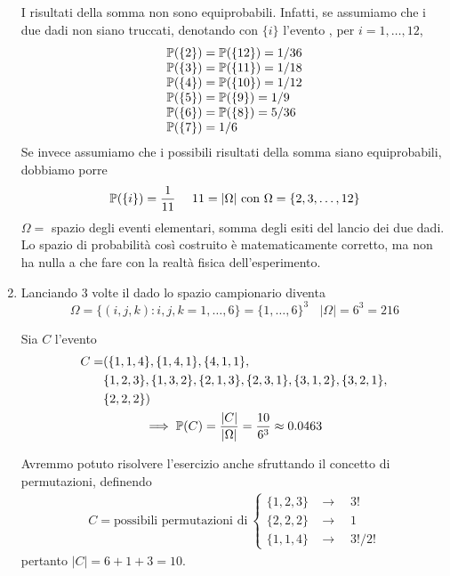 \begin{enumerate}
	\begin{rem}
		I risultati della somma non sono equiprobabili. Infatti, se assumiamo che i due dadi non siano truccati, denotando con $\{i\}$ l'evento , per $i=1,\dots ,12$,
		\begin{equation*}
			\begin{array}{ l }
				\mathbb{P}(\{2\}) =\mathbb{P}(\{12\}) =1/36\\
				\mathbb{P}(\{3\}) =\mathbb{P}(\{11\}) =1/18\\
				\mathbb{P}(\{4\}) =\mathbb{P}(\{10\}) =1/12\\
				\mathbb{P}(\{5\}) =\mathbb{P}(\{9\}) =1/9\\
				\mathbb{P}(\{6\}) =\mathbb{P}(\{8\}) =5/36\\
				\mathbb{P}(\{7\}) =1/6
			\end{array}
		\end{equation*}
		Se invece assumiamo che i possibili risultati della somma siano equiprobabili, dobbiamo porre
		\begin{equation*}
			\PP(\{i\}) =\frac{1}{11} \ \ \ \ 11=|\Omega| \ \text{con} \ \Omega =\{2,3,\dots ,12\}
		\end{equation*}
		$\Omega =$ spazio degli eventi elementari, somma degli esiti del lancio dei due dadi. Lo spazio di probabilità così costruito è matematicamente corretto, ma non ha nulla a che fare con la realtà fisica dell'esperimento.
	\end{rem}

	\item Lanciando $3$ volte il dado lo spazio campionario diventa
	\begin{equation*}
		\Omega =\{(i,j,k) :i,j,k=1,\dots ,6\} =\{1,\dots ,6\}^{3} \ \ \ \ |\Omega| =6^{3} =216
	\end{equation*}

	Sia $C$ l'evento \event{la somma dei dadi è $6$}
	\begin{gather*}
		\begin{aligned}
			C= & (\{1,1,4\} ,\{1,4,1\} ,\{4,1,1\} ,\\
			 & \{1,2,3\} ,\{1,3,2\} ,\{2,1,3\} ,\{2,3,1\} ,\{3,1,2\} ,\{3,2,1\} ,\\
			 & \{2,2,2\})
		\end{aligned}\\
		\implies \mathbb{P}(C) =\frac{| C| }{|\Omega| } =\frac{10}{6^{3}} \approx 0.0463
	\end{gather*}

	\begin{rem}
		Avremmo potuto risolvere l'esercizio anche sfruttando il concetto di permutazioni, definendo
		\begin{gather*}
			C=\text{possibili permutazioni di} \ 
			\begin{cases}
				\{1,2,3\} & \to\quad 3!\\
				\{2,2,2\} & \to\quad 1\\
				\{1,1,4\} & \to\quad 3!/2!
			\end{cases}
		\end{gather*}
		pertanto $|C|=6+1+3=10$.
	\end{rem}
	
\end{enumerate}

